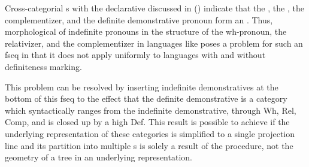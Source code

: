 \noindent Cross-categorial s with the declarative  discussed in \citeauthor{BaunazLander2017} (\citeyear{BaunazLander2017,BaunazLander2018,Baunaz-Lander-Glossa}) indicate that the , the , the complementizer, and the definite demonstrative pronoun form an . Thus, morphological  of indefinite  pronouns in the structure of the wh-pronoun, the relativizer, and the complementizer in languages like  poses a problem for such an fseq in that it does not apply uniformly to languages with and without definiteness marking.
\par
This problem can be resolved by inserting indefinite demonstratives at the bottom of this fseq to the effect that the definite demonstrative is a category which syntactically ranges from the indefinite demonstrative, through Wh, Rel, Comp, and is closed up by a high Def. This result is possible to achieve if the underlying representation of these categories is simplified to a single projection line and its partition into multiple s is solely a result of the  procedure, not the geometry of a tree in an underlying representation.




 
